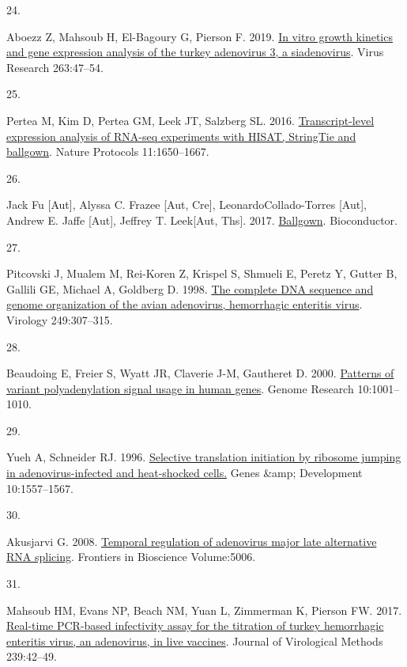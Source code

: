 \documentclass[
]{article}
\newlength{\cslhangindent}
\newlength{\csllabelwidth}
\newenvironment{CSLReferences}[2] %
 {\begin{list}{}{%
  \setlength{\itemindent}{0pt}
  \setlength{\leftmargin}{0pt}
  \setlength{\parsep}{0pt}
  \ifodd #1
   \setlength{\leftmargin}{\cslhangindent}
   \setlength{\itemindent}{-1\cslhangindent}
  \fi
  \setlength{\itemsep}{#2\baselineskip}}}
 {\end{list}}
\newcommand{\CSLLeftMargin}[1]{\parbox[t]{\csllabelwidth}{\strut#1\strut}}
\newcommand{\CSLRightInline}[1]{\parbox[t]{\linewidth - \csllabelwidth}{\strut#1\strut}}
\begin{document}
\begin{CSLReferences}{0}{1}
\CSLLeftMargin{24. }%
\CSLRightInline{Aboezz Z, Mahsoub H, El-Bagoury G, Pierson F. 2019.
\href{https://www.sciencedirect.com/science/article/abs/pii/S016817021830529X?via\%3Dihub}{In
vitro growth kinetics and gene expression analysis of the turkey
adenovirus 3, a siadenovirus}. Virus Research 263:47--54.}

\CSLLeftMargin{25. }%
\CSLRightInline{Pertea M, Kim D, Pertea GM, Leek JT, Salzberg SL. 2016.
\href{https://doi.org/10.1038/nprot.2016.095}{Transcript-level
expression analysis of RNA-seq experiments with HISAT, StringTie and
ballgown}. Nature Protocols 11:1650--1667.}

\CSLLeftMargin{26. }%
\CSLRightInline{Jack Fu {[}Aut{]}, Alyssa C. Frazee {[}Aut, Cre{]},
LeonardoCollado-Torres {[}Aut{]}, Andrew E. Jaffe {[}Aut{]}, Jeffrey T.
Leek{[}Aut, Ths{]}. 2017.
\href{https://doi.org/10.18129/B9.BIOC.BALLGOWN}{Ballgown}.
Bioconductor.}

\CSLLeftMargin{27. }%
\CSLRightInline{Pitcovski J, Mualem M, Rei-Koren Z, Krispel S, Shmueli
E, Peretz Y, Gutter B, Gallili GE, Michael A, Goldberg D. 1998.
\href{https://doi.org/10.1006/viro.1998.9336}{The complete {DNA}
sequence and genome organization of the avian adenovirus, hemorrhagic
enteritis virus}. Virology 249:307--315.}

\CSLLeftMargin{28. }%
\CSLRightInline{Beaudoing E, Freier S, Wyatt JR, Claverie J-M, Gautheret
D. 2000. \href{https://doi.org/10.1101/gr.10.7.1001}{Patterns of variant
polyadenylation signal usage in human genes}. Genome Research
10:1001--1010.}

\CSLLeftMargin{29. }%
\CSLRightInline{Yueh A, Schneider RJ. 1996.
\href{https://doi.org/10.1101/gad.10.12.1557}{Selective translation
initiation by ribosome jumping in adenovirus-infected and heat-shocked
cells.} Genes \&amp; Development 10:1557--1567.}

\CSLLeftMargin{30. }%
\CSLRightInline{Akusjarvi G. 2008.
\href{https://doi.org/10.2741/3059}{Temporal regulation of adenovirus
major late alternative RNA splicing}. Frontiers in Bioscience
Volume:5006.}

\CSLLeftMargin{31. }%
\CSLRightInline{Mahsoub HM, Evans NP, Beach NM, Yuan L, Zimmerman K,
Pierson FW. 2017.
\href{https://doi.org/10.1016/j.jviromet.2016.11.002}{Real-time
{PCR}-based infectivity assay for the titration of turkey hemorrhagic
enteritis virus, an adenovirus, in live vaccines}. Journal of
Virological Methods 239:42--49.}


\end{CSLReferences}
\end{document}

